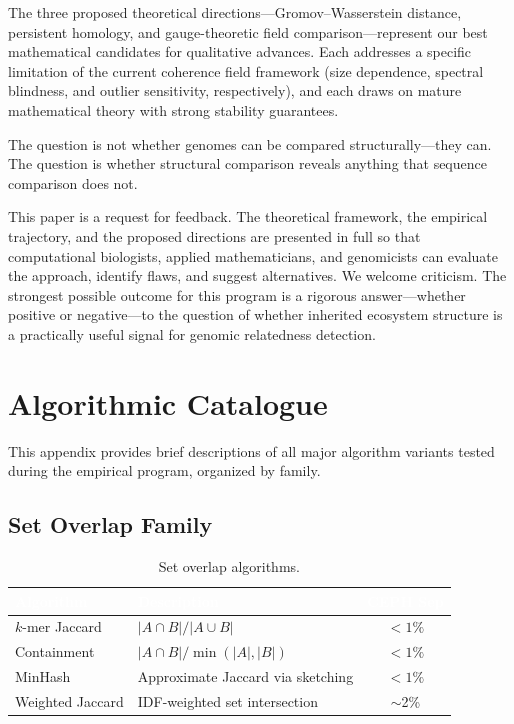 \documentclass{../yalumba}
\begin{document}
The three proposed theoretical directions---Gromov--Wasserstein distance,
persistent homology, and gauge-theoretic field comparison---represent
our best mathematical candidates for qualitative advances.  Each
addresses a specific limitation of the current coherence field framework
(size dependence, spectral blindness, and outlier sensitivity,
respectively), and each draws on mature mathematical theory with strong
stability guarantees.

\begin{pullquote}
The question is not whether genomes can be compared structurally---they
can.  The question is whether structural comparison reveals anything
that sequence comparison does not.
\end{pullquote}

This paper is a request for feedback.  The theoretical framework, the
empirical trajectory, and the proposed directions are presented in full
so that computational biologists, applied mathematicians, and genomicists
can evaluate the approach, identify flaws, and suggest alternatives.
We welcome criticism.  The strongest possible outcome for this program
is a rigorous answer---whether positive or negative---to the question of
whether inherited ecosystem structure is a practically useful signal
for genomic relatedness detection.


\appendix
\section{Algorithmic Catalogue}
\label{sec:catalogue}

This appendix provides brief descriptions of all major algorithm
variants tested during the empirical program, organized by family.

\subsection{Set Overlap Family}

\begin{table}[H]
  \centering
  \tablestyle
  \caption{Set overlap algorithms.}
  \label{tab:cat_set}
  \begin{tabular}{llc}
    \toprule
    \rowcolor{table-header}
    \textcolor{white}{\textbf{Algorithm}} &
    \textcolor{white}{\textbf{Description}} &
    \textcolor{white}{\textbf{CEPH Sep}} \\
    \midrule
    $k$-mer Jaccard & $|A \cap B| / |A \cup B|$ & $<1\%$ \\
    Containment & $|A \cap B| / \min(|A|, |B|)$ & $<1\%$ \\
    MinHash & Approximate Jaccard via sketching & $<1\%$ \\
    Weighted Jaccard & IDF-weighted set intersection & $\sim$2\% \\
    \bottomrule
  \end{tabular}
\end{table}
\end{document}
